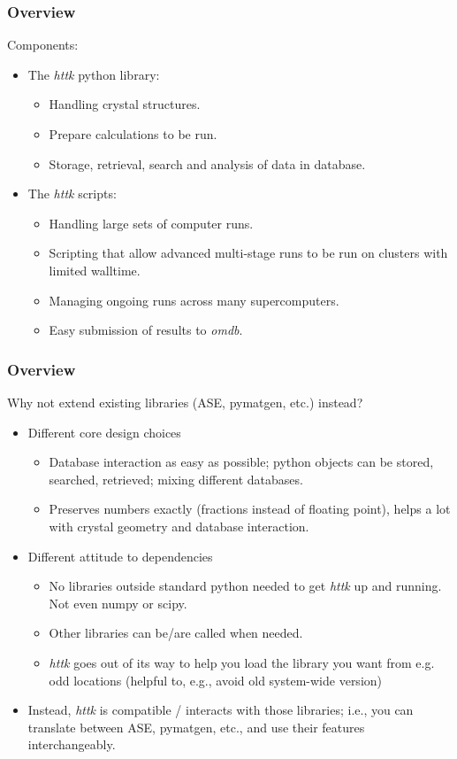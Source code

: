 \documentclass[dvipsnames]{beamer}
\begin{document}
\begin{frame}
\frametitle{Overview}
Components:\\[0.1cm]
\begin{itemize}
\item The \emph{httk} python library:
\begin{itemize}
  \item Handling crystal structures.
  \item Prepare calculations to be run.
  \item Storage, retrieval, search and analysis of data in database.
\end{itemize}
\vspace{0.5cm}
\item The \emph{httk} scripts:
\begin{itemize}
  \item Handling large sets of computer runs.
  \item Scripting that allow advanced multi-stage runs to be run on clusters with limited walltime.
  \item Managing ongoing runs across many supercomputers.
  \item Easy submission of results to \emph{omdb}. 
\end{itemize}
\end{itemize}
\end{frame}

\begin{frame}
\frametitle{Overview}
Why not extend existing libraries (ASE, pymatgen, etc.) instead?\\[0.1cm]
\begin{itemize}
  \item Different core design choices
  \begin{itemize}
    \item {\color{red}Database interaction as easy as possible;} python objects can be stored, searched, retrieved; mixing different databases.
    \item Preserves numbers exactly (fractions instead of floating point), helps a lot with crystal geometry and database interaction.
  \end{itemize}
  \item Different attitude to dependencies
  \begin{itemize}  
    \item {\color{red}No libraries outside standard python needed to get \emph{httk} up and running.} Not even numpy or scipy.
    \item Other libraries can be/are called when needed.
    \item \emph{httk} goes out of its way to help you load the library you want from e.g. odd locations (helpful to, e.g., avoid old system-wide version)
  \end{itemize}
  \item Instead, \emph{httk} is compatible / interacts with those libraries; i.e., you {\color{red}can translate between ASE, pymatgen, etc.,} and use their features interchangeably.
\end{itemize}
\end{frame}
\end{document}
